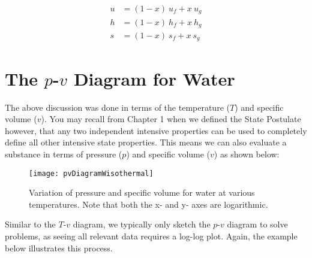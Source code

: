 \begin{align*}
  u &= (1-x)\ u_f + x\ u_g \\
  h &= (1-x)\ h_f + x\ h_g \\
  s &= (1-x)\ s_f + x\ s_g
\end{align*}

\section{The $p$-$v$ Diagram for Water}
The above discussion was done in terms of the temperature ($T$) and specific volume ($v$). You may recall from Chapter 1 when we defined the State Postulate however, that any two independent intensive properties can be used to completely define all other intensive state properties. This means we can also evaluate a substance in terms of pressure ($p$) and specific volume ($v$) as shown below:

\begin{figure}[H]
\centering
\texttt{[image: pvDiagramWisothermal]}
\caption{Variation of pressure and specific volume for water at various temperatures.  Note that both the x- and y- axes are logarithmic.}
\label{fig:ch2_PvDiagram}
\end{figure}

Similar to the $T$-$v$ diagram, we typically only sketch the $p$-$v$ diagram to solve problems, as seeing all relevant data requires a log-log plot.  Again, the example below illustrates this process.

